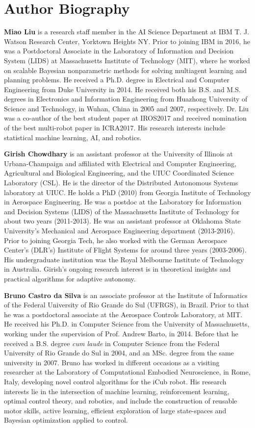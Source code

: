\documentclass[letterpaper,12pt,peerreviewca,draftcls]{IEEEtran}
\begin{document}
\section{Author Biography}
\noindent \textbf{Miao Liu} is a research staff member in the AI Science Department at IBM T. J. Watson Research Center, Yorktown Heights NY. Prior to joining IBM in 2016, he was a Postdoctoral Associate in the Laboratory of Information and Decision System (LIDS) at Massachusetts Institute of Technology (MIT), where he worked on scalable Bayesian nonparametric methods for solving multiagent learning and planning problems. He received a Ph.D. degree in Electrical and Computer Engineering from Duke University in 2014. He received both his B.S. and M.S. degrees in Electronics and Information Engineering from Huazhong University of Science and Technology, in Wuhan, China in 2005 and 2007, respectively. Dr. Liu was a co-author of the best student paper at IROS2017 and received nomination of the best multi-robot paper in ICRA2017. His research interests include statistical machine learning, AI, and robotics.

\noindent \textbf{Girish Chowdhary} is an assistant professor at the University of Illinois at Urbana-Champaign and affiliated with Electrical and Computer Engineering, Agricultural and Biological Engineering, and the UIUC Coordinated Science Laboratory (CSL). He is the director of the Distributed Autonomous Systems laboratory at UIUC. He holds a PhD (2010) from Georgia Institute of Technology in Aerospace Engineering. He was a postdoc at the Laboratory for Information and Decision Systems (LIDS) of the Massachusetts Institute of Technology for about two years (2011-2013). He was an assistant professor at Oklahoma State University’s Mechanical and Aerospace Engineering department (2013-2016). Prior to joining Georgia Tech, he also worked with the German Aerospace Center's (DLR's) Institute of Flight Systems for around three years (2003-2006). His undergraduate institution was the Royal Melbourne Institute of Technology in Australia. Girish's ongoing research interest is in theoretical insights and practical algorithms for adaptive autonomy. 

\noindent \textbf{Bruno Castro da Silva} is an associate professor at the Institute of Informatics of the Federal University of Rio Grande do Sul (UFRGS), in Brazil. Prior to that he was a postdoctoral associate at the Aerospace Controls Laboratory, at MIT. He received his Ph.D. in Computer Science from the University of Massachusetts, working under the supervision of Prof. Andrew Barto, in 2014. Before that he received a B.S. degree \emph{cum laude} in Computer Science from the Federal University of Rio Grande do Sul in 2004, and an MSc. degree from the same university in 2007. Bruno has worked in different occasions as a visiting researcher at the Laboratory of Computational Embodied Neuroscience, in Rome, Italy, developing novel control algorithms for the iCub robot. His research interests lie in the intersection of machine learning, reinforcement learning, optimal control theory, and robotics, and include the construction of reusable motor skills, active learning, efficient exploration of large state-spaces and Bayesian optimization applied to control.
\end{document}
